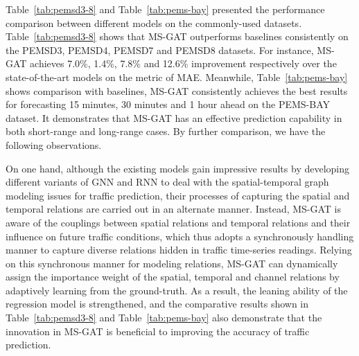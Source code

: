 Table~\ref{tab:pemsd3-8} and Table~\ref{tab:pems-bay} presented the performance comparison between different models on the commonly-used datasets. Table~\ref{tab:pemsd3-8} shows that MS-GAT outperforms baselines consistently on the PEMSD3, PEMSD4, PEMSD7 and PEMSD8 datasets. For instance, MS-GAT achieves 7.0\%, 1.4\%, 7.8\% and 12.6\% improvement respectively over the state-of-the-art models on the metric of MAE. Meanwhile, Table~\ref{tab:pems-bay} shows comparison with baselines, MS-GAT consistently achieves the  best results for forecasting 15 minutes, 30 minutes and 1 hour ahead on the PEMS-BAY dataset. It demonstrates that MS-GAT has an effective prediction capability in both short-range and long-range cases. By further comparison, we have the following observations.

On one hand, although the existing models gain impressive results by developing different variants of GNN and RNN to deal with the spatial-temporal graph modeling issues for traffic prediction,  their processes of  capturing the spatial and temporal relations are carried out in an alternate manner. Instead, MS-GAT is aware of the couplings between spatial relations and temporal relations and their influence on future traffic conditions, which thus adopts a synchronously handling manner to capture diverse relations hidden in traffic time-series readings. Relying on this synchronous manner for modeling relations, MS-GAT can dynamically assign the importance weight of the spatial, temporal  and channel relations by adaptively learning from the ground-truth. As a result, the leaning ability of the regression model is strengthened, and the comparative results shown in Table~\ref{tab:pemsd3-8} and Table~\ref{tab:pems-bay} also demonstrate that the innovation in MS-GAT is beneficial to improving the accuracy of traffic prediction.

